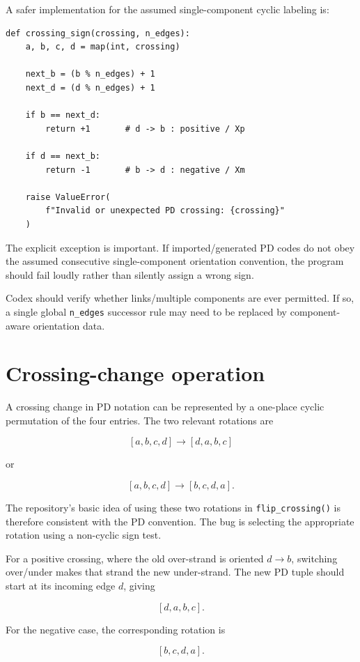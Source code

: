 \documentclass[11pt]{article}
\begin{document}
A safer implementation for the assumed single-component cyclic labeling is:

\begin{verbatim}
def crossing_sign(crossing, n_edges):
    a, b, c, d = map(int, crossing)

    next_b = (b % n_edges) + 1
    next_d = (d % n_edges) + 1

    if b == next_d:
        return +1       # d -> b : positive / Xp

    if d == next_b:
        return -1       # b -> d : negative / Xm

    raise ValueError(
        f"Invalid or unexpected PD crossing: {crossing}"
    )
\end{verbatim}

The explicit exception is important. If imported/generated PD codes do not obey the assumed consecutive single-component orientation convention, the program should fail loudly rather than silently assign a wrong sign.

Codex should verify whether links/multiple components are ever permitted. If so, a single global \texttt{n\_edges} successor rule may need to be replaced by component-aware orientation data.

\section{Crossing-change operation}

A crossing change in PD notation can be represented by a one-place cyclic permutation of the four entries. The two relevant rotations are

\[
[a,b,c,d]\longrightarrow[d,a,b,c]
\]

or

\[
[a,b,c,d]\longrightarrow[b,c,d,a].
\]

The repository's basic idea of using these two rotations in \texttt{flip\_crossing()} is therefore consistent with the PD convention. The bug is selecting the appropriate rotation using a non-cyclic sign test.

For a positive crossing, where the old over-strand is oriented \(d\to b\), switching over/under makes that strand the new under-strand. The new PD tuple should start at its incoming edge \(d\), giving

\[
\boxed{[d,a,b,c]}.
\]

For the negative case, the corresponding rotation is

\[
\boxed{[b,c,d,a]}.
\]
\end{document}
